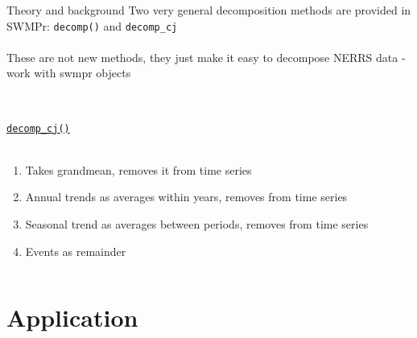 \documentclass[xcolor=dvipsnames,serif]{beamer}\usepackage[]{graphicx}\usepackage[]{color}
\begin{document}
\begin{frame}[t]{Theory and background}
Two very general decomposition methods are provided in SWMPr: \texttt{decomp()} and \texttt{decomp_cj} \\~\\
These are not new methods, they just make it easy to decompose NERRS data - work with swmpr objects  \\~\\
\begin{columns}[t]
\begin{column}{\textwidth}
\underline{\texttt{decomp_cj()}}\\~\\
\begin{enumerate}
\item Takes grandmean, removes it from time series
\item<2-> Annual trends as averages within years, removes from time series
\item<3-> Seasonal trend as averages between periods, removes from time series
\item<4-> Events as remainder
\end{enumerate}
\end{column}
\end{columns}
\end{frame}

\section{Application}
\end{document}
